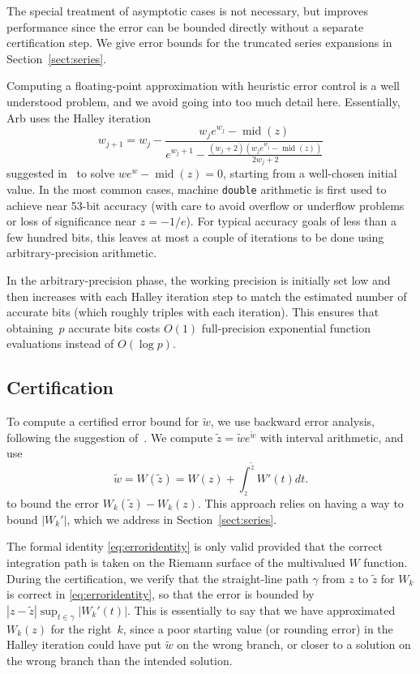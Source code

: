 \documentclass[11pt,a4paper]{article}
\begin{document}
The special treatment of asymptotic cases is not necessary, but
improves performance
since the error can be bounded directly without a separate certification step.
We give error bounds for the truncated series expansions
in Section~\ref{sect:series}.

Computing a floating-point approximation with heuristic error control
is a well understood problem, and we avoid going into
too much detail here.
Essentially, Arb uses the Halley iteration
$$w_{j+1} = w_j - \frac{w_j e^{w_j} - \operatorname{mid}(z)}{e^{w_j+1} - \displaystyle\frac{(w_j+2)(w_j e^{w_j} - \operatorname{mid}(z))}{2 w_j + 2}}$$
suggested in~\cite{corless1996lambertw} to solve $w e^w - \operatorname{mid}(z) = 0$,
starting from a well-chosen initial value.
In the most common cases, machine \texttt{double} arithmetic is first
used to achieve near 53-bit accuracy (with care to avoid overflow
or underflow problems or loss of significance near $z = -1/e$).
For typical accuracy goals of less than a few hundred bits,
this leaves at most a couple of iterations to be done using arbitrary-precision arithmetic.

In the arbitrary-precision phase,
the working precision is initially set low and then increases
with each Halley iteration step to match the estimated number of accurate bits
(which roughly triples with each iteration). This ensures that
obtaining~$p$ accurate bits costs $O(1)$ full-precision exponential
function evaluations instead of $O(\log p)$.

\subsection{Certification}

To compute a certified error bound for $\tilde w$,
we use backward error analysis, following the suggestion of~\cite{corless1996lambertw}.
We compute $\tilde z = {\tilde w} e^{\tilde w}$ with interval arithmetic,
and use
\begin{equation}
\label{eq:erroridentity}
\tilde w = W(\tilde z) = W(z) + \int_z^{\tilde z} W'(t) dt.
\end{equation}
to bound the error $W_k(\tilde z) - W_k(z)$.
This approach relies on having a way to bound $|W_k'|$, which we address in Section~\ref{sect:series}.

The formal identity \eqref{eq:erroridentity}
is only valid provided that the correct integration
path is taken on the Riemann surface of the multivalued $W$ function.
During the certification, we verify that
the straight-line path $\gamma$ from $z$ to $\tilde z$
for $W_k$ is correct in \eqref{eq:erroridentity}, so that
the error is bounded by
$|z-\tilde z| \sup_{t \in \gamma} |W_k'(t)|$.
This is essentially to say that we have approximated $W_k(z)$
for the right~$k$, since a poor starting value (or rounding error)
in the Halley iteration could have put $\tilde w$ on the wrong branch,
or closer to a solution on the wrong branch than the intended solution.
\end{document}
